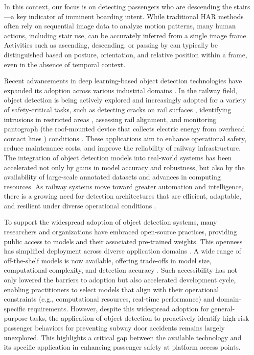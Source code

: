 \documentclass[journal,twoside,web]{ieeecolor}
\begin{document}
In this context, our focus is on detecting passengers who are descending the stairs—a key indicator of imminent boarding intent. While traditional \ac{HAR} methods often rely on sequential image data to analyze motion patterns, many human actions, including stair use, can be accurately inferred from a single image frame. Activities such as ascending, descending, or passing by can typically be distinguished based on posture, orientation, and relative position within a frame, even in the absence of temporal context.

Recent advancements in deep learning-based object detection technologies have expanded its adoption across various industrial domains \cite{li2024development}. In the railway field, object detection is being actively explored and increasingly adopted for a variety of safety-critical tasks, such as detecting cracks on rail surfaces \cite{d2024automated}, identifying intrusions in restricted areas \cite{cao2024railway}, assessing rail alignment, and monitoring pantograph (the roof-mounted device that collects electric energy from overhead contact lines \cite{wu2017pantograph}) conditions \cite{li2025branch}. These applications aim to enhance operational safety, reduce maintenance costs, and improve the reliability of railway infrastructure. The integration of object detection models into real-world systems has been accelerated not only by gains in model accuracy and robustness, but also by the availability of large-scale annotated datasets and advances in computing resources. As railway systems move toward greater automation and intelligence, there is a growing need for detection architectures that are efficient, adaptable, and resilient under diverse operational conditions \cite{nold2023will}.

To support the widespread adoption of object detection systems, many researchers and organizations have embraced open-source practices, providing public access to models and their associated pre-trained weights. This openness has simplified deployment across diverse application domains \cite{redmon2016you, jocher2020ultralytics}. A wide range of off-the-shelf models is now available, offering trade-offs in model size, computational complexity, and detection accuracy \cite{wang_yolov7_2022, wang_yolov9_2024, tan2020efficientdet}. Such accessibility has not only lowered the barriers to adoption but also accelerated development cycle, enabling practitioners to select models that align with their operational constraints (e.g., computational resources, real-time performance) and domain-specific requirements. However, despite this widespread adoption for general-purpose tasks, the application of object detection to proactively identify high-risk passenger behaviors for preventing subway door accidents remains largely unexplored. This highlights a critical gap between the available technology and its specific application in enhancing passenger safety at platform access points. 
\end{document}

